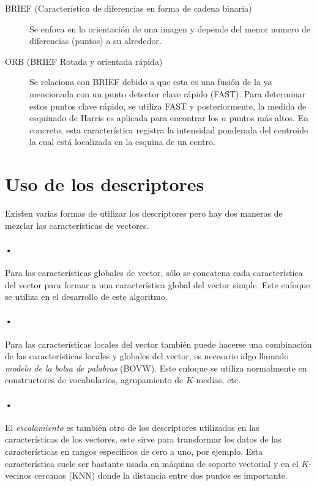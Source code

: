 \begin{description}
\item[BRIEF (Característica de diferencias en forma de cadena binaria)]{Se enfoca en la orientación de una imagen y depende del menor numero de diferencias (puntos) a su alrededor.}
\end{description}

\begin{description}
\item[ORB (BRIEF Rotada y orientada rápida)]{Se relaciona con BRIEF debido a
que esta es una fusión de la ya mencionada con un punto detector clave rápido (FAST). Para determinar estos puntos clave rápido, se utiliza FAST y posteriormente, la medida de esquinado de Harris es aplicada para encontrar los $n$ puntos más altos. En concreto, esta característica registra la intensidad ponderada del centroide la cual está localizada en la esquina de un centro.}
\end{description}

\section{Uso de los descriptores}
Existen varias formas de utilizar los descriptores pero hay dos maneras de mezclar las características de vectores.

\paragraph{•} Para las características globales de vector, sólo se concatena cada característica del vector para formar a una característica global del vector simple. Este enfoque se utiliza en el desarrollo de este algoritmo.

\paragraph{•} Para las características locales del vector también puede hacerse una combinación de las características locales y globales del vector, es necesario algo llamado \emph{modelo de la bolsa de palabras} (BOVW). Este enfoque se utiliza normalmente en constructores de vocabularios, agrupamiento de $K$-medias, etc.

\paragraph{•} El \emph{escalamiento} es también otro de los descriptores utilizados en las características de los vectores, este sirve para transformar los datos de las características en rangos específicos de cero a uno, por ejemplo. Esta característica suele ser bastante usada en máquina de soporte vectorial y en el $K$-vecinos cercanos (KNN) donde la distancia entre dos puntos es importante.

